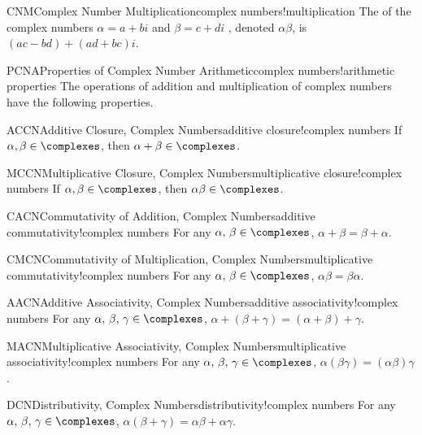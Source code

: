%
%
\begin{definition}{CNM}{Complex Number Multiplication}{complex numbers!multiplication}
The  of the complex numbers $\alpha=a+bi$ and $\beta=c+di$ , denoted $\alpha\beta$, is $(ac-bd)+(ad+bc)i$.
\end{definition}
%
\begin{theorem}{PCNA}{Properties of Complex Number Arithmetic}{complex numbers!arithmetic properties}
The operations of addition and multiplication of complex numbers have the following properties.
%
\begin{propertylist}
%
\begin{property}{ACCN}{Additive Closure, Complex Numbers}{additive closure!complex numbers}
If $\alpha,\beta\in\complexes$, then $\alpha+\beta\in\complexes$.\end{property}
%
\begin{property}{MCCN}{Multiplicative Closure, Complex Numbers}{multiplicative closure!complex numbers}
If $\alpha,\beta\in\complexes$, then $\alpha\beta\in\complexes$.\end{property}
%
\begin{property}{CACN}{Commutativity of Addition, Complex Numbers}{additive commutativity!complex numbers}
For any $\alpha,\,\beta\in\complexes$, $\alpha+\beta=\beta+\alpha$.\end{property}
%
\begin{property}{CMCN}{Commutativity of Multiplication, Complex Numbers}{multiplicative commutativity!complex numbers}
For any $\alpha,\,\beta\in\complexes$, $\alpha\beta=\beta\alpha$.\end{property}
%
\begin{property}{AACN}{Additive Associativity, Complex Numbers}{additive associativity!complex numbers}
For any $\alpha,\,\beta,\,\gamma\in\complexes$, $\alpha+\left(\beta+\gamma\right)=\left(\alpha+\beta\right)+\gamma$.\end{property}
%
\begin{property}{MACN}{Multiplicative Associativity, Complex Numbers}{multiplicative associativity!complex numbers}
For any $\alpha,\,\beta,\,\gamma\in\complexes$, $\alpha\left(\beta\gamma\right)=\left(\alpha\beta\right)\gamma$.\end{property}
%
\begin{property}{DCN}{Distributivity, Complex Numbers}{distributivity!complex numbers}
For any $\alpha,\,\beta,\,\gamma\in\complexes$, $\alpha(\beta+\gamma)=\alpha\beta+\alpha\gamma$.\end{property}

\end{propertylist}
\end{theorem}
